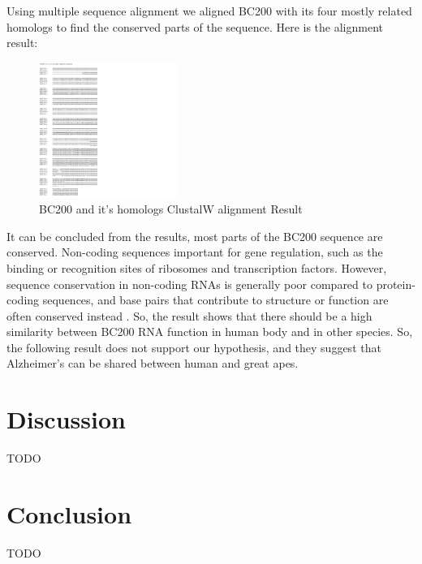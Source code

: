 \documentclass[conference]{IEEEtran}
\begin{document}
Using multiple sequence alignment we aligned BC200 with its four mostly related homologs to find the conserved parts of the sequence.
Here is the alignment result:

\begin{figure}[h]
  \centering
  \includegraphics[width=0.4\textwidth]{figs/alignment.png}
  \caption{BC200 and it's homologs ClustalW alignment Result}
  \label{fig:alignment result}
\end{figure}

It can be concluded from the results, most parts of the BC200 sequence are conserved. 
Non-coding sequences important for gene regulation, such as the binding or recognition sites of ribosomes and transcription factors. 
However, sequence conservation in non-coding RNAs is generally poor compared to protein-coding sequences, and base pairs that contribute to structure or function are often conserved instead \cite{johnsson2014evolutionary}. 
So, the result shows that there should be a high similarity between BC200 RNA function in human body and in other species. 
So, the following result does not support our hypothesis, and they suggest that Alzheimer’s can be shared between human and great apes.

\section{Discussion}\label{sec:discussion}
TODO

\section{Conclusion}\label{sec:conclusion}
TODO



\end{document}
